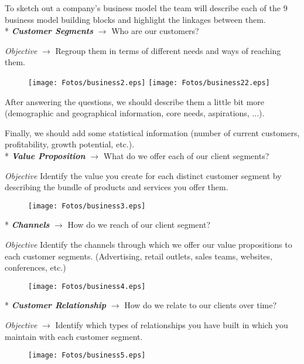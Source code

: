 \documentclass[11pt,a4paper]{article}
\begin{document}
To sketch out a company's business model the team will describe each of the 9 business model building blocks and highlight the linkages between them.\\

* \emph{\textbf{Customer Segments}} $\to$ Who are our customers?

\emph{Objective} $\to$ Regroup them in terms of different needs and ways of reaching them.\\
\begin{figure}[hbtp]
\begin{center}
\texttt{[image: Fotos/business2.eps]}
\texttt{[image: Fotos/business22.eps]}
\end{center}
\end{figure}
After answering the questions, we should describe them a little bit more (demographic and geographical information, core needs, aspirations, ...).

Finally, we should add some statistical information (number of current customers, profitability, growth potential, etc.).\\

* \emph{\textbf{Value Proposition}} $\to$ What do we offer each of our client segments?

\emph{Objective} Identify the value you create for each distinct customer segment by describing the bundle of products and services you offer them.\\
\begin{figure}[hbtp]
\begin{center}
\texttt{[image: Fotos/business3.eps]}
\end{center}
\end{figure}

* \emph{\textbf{Channels}} $\to$ How do we reach of our client segment?

\emph{Objective} Identify the channels through which we offer our value propositions to each customer segments. (Advertising, retail outlets, sales teams, websites, conferences, etc.)\\
\begin{figure}[hbtp]
\begin{center}
\texttt{[image: Fotos/business4.eps]}
\end{center}
\end{figure}

* \emph{\textbf{Customer Relationship}} $\to$ How do we relate to our clients over time?

\emph{Objective} $\to$ Identify which types of relationships you have built in which you maintain with each customer segment.\\
\begin{figure}[hbtp]
\begin{center}
\texttt{[image: Fotos/business5.eps]}
\end{center}
\end{figure}
\end{document}
